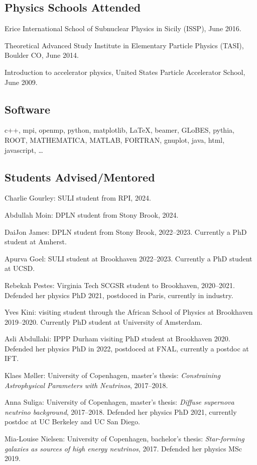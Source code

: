 \documentclass{article}
\renewenvironment{itemize}{
\begin{list}{}{
\setlength{\leftmargin}{.5em}}}{
\end{list}}
\begin{document}
\subsection*{Physics Schools Attended}
\begin{itemize}
\item Erice International School of Subnuclear Physics in Sicily (ISSP), June 2016.
\item Theoretical Advanced Study Institute in Elementary Particle Physics (TASI), Boulder CO, June 2014.
\item Introduction to accelerator physics, United States Particle Accelerator School, June 2009.
\end{itemize}

\subsection*{Software}
\begin{itemize}
\item 
c++, mpi, openmp, python, matplotlib, \LaTeX, beamer, GLoBES, pythia, ROOT, MATHEMATICA, MATLAB, FORTRAN, gnuplot, java, html, javascript, \dots
\end{itemize}

\subsection*{Students Advised/Mentored}
\begin{itemize}
\item Charlie Gourley: SULI student from RPI, 2024.
\item Abdullah Moin: DPLN student from Stony Brook, 2024.
\item DaiJon James: DPLN student from Stony Brook, 2022--2023.
Currently a PhD student at Amherst.
\item Apurva Goel: SULI student at Brookhaven 2022--2023.
Currently a PhD student at UCSD.
\item Rebekah Pestes: Virginia Tech SCGSR student to Brookhaven, 2020--2021.
Defended her physics PhD 2021, postdoced in Paris, currently in industry.
\item Yves Kini: visiting student through the African School of Physics at Brookhaven 2019--2020.
Currently PhD student at University of Amsterdam.
\item Asli Abdullahi: IPPP Durham visiting PhD student at Brookhaven 2020.
Defended her physics PhD in 2022, postdoced at FNAL, currently a postdoc at IFT.
\item Klaes M\o ller: University of Copenhagen, master's thesis: \emph{Constraining Astrophysical Parameters with Neutrinos}, 2017--2018.
\item Anna Suliga: University of Copenhagen, master's thesis: \emph{Diffuse supernova neutrino background}, 2017--2018.
Defended her physics PhD 2021, currently postdoc at UC Berkeley and UC San Diego.
\item Mia-Louise Nielsen: University of Copenhagen, bachelor's thesis: \emph{Star-forming galaxies as sources of high energy neutrinos}, 2017.
Defended her physics MSc 2019.
\end{itemize}
\end{document}
